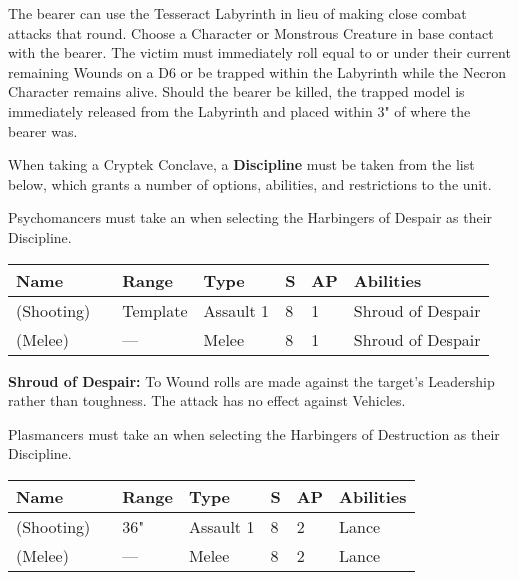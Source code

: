 The bearer can use the Tesseract Labyrinth in lieu of making close combat attacks that round. Choose a Character or Monstrous Creature in base contact with the bearer. The victim must immediately roll equal to or under their current remaining Wounds on a D6 or be trapped within the Labyrinth while the Necron Character remains alive. Should the bearer be killed, the trapped model is immediately released from the Labyrinth and placed within 3" of where the bearer was.


 \label{Artefacts of the Aeons}



When taking a Cryptek Conclave, a \textbf{Discipline} must be taken from the list below, which grants a number of options, abilities, and restrictions to the unit.


Psychomancers must take an  when selecting the Harbingers of Despair as their Discipline.

\label{Abyssal Staff}
\noindent
\begin{tabular}{||m{130pt} m{10pt} m{31pt} m{55pt} m{12pt} m{12pt} m{210pt}||}
	\hline
	Name & & Range & Type & S & AP & Abilities \\
	\hline
	\quickref{Abyssal Staff} (Shooting) & & Template & Assault 1 & 8 & 1 & Shroud of Despair \\
	\quickref{Abyssal Staff} (Melee) & & — & Melee & 8 & 1 & Shroud of Despair \\
	\hline
\end{tabular}

\textbf{Shroud of Despair:} To Wound rolls are made against the target's Leadership rather than toughness. The attack has no effect against Vehicles.






Plasmancers must take an  when selecting the Harbingers of Destruction as their Discipline.

\label{Eldritch Lance}
\noindent
\begin{tabular}{||m{130pt} m{10pt} m{31pt} m{55pt} m{12pt} m{12pt} m{210pt}||}
	\hline
	Name & & Range & Type & S & AP & Abilities \\
	\hline
	\quickref{Eldritch Lance} (Shooting) & & 36" & Assault 1 & 8 & 2 & Lance \\
	\quickref{Eldritch Lance} (Melee) & & — & Melee & 8 & 2 & Lance \\
	\hline
\end{tabular}

